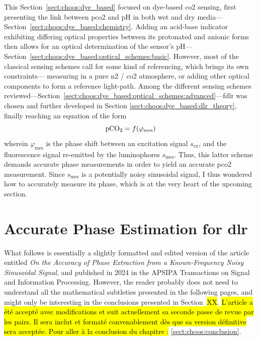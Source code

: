 This Section~\ref{sect:choos:dye_based} focused on dye-based \gls{co2} sensing, first presenting the link between \gls{pco2} and pH in both wet and dry media---Section~\ref{sect:choos:dye_based:chemistry}. Adding an acid-base indicator exhibiting differing optical properties between its protonated and anionic forms then allows for an optical determination of the sensor's pH---Section~\ref{sect:choos:dye_based:optical_schemes:basic}. However, most of the classical sensing schemes call for some kind of referencing, which brings its own constraints---\eg{} measuring in a pure \gls{n2} / \gls{co2} atmosphere, or adding other optical components to form a reference light-path. Among the different sensing schemes reviewed---Section~\ref{sect:choos:dye_based:optical_schemes:advanced}---\gls{fdlr} was chosen and further developed in Section \ref{sect:choos:dye_based:dlr_theory}, finally reaching an equation of the form
\begin{equation}
	\ce{pCO_2} = f(\varphi_\text{mes})
\end{equation}
wherein $\varphi_\text{mes}$ is the phase shift between an excitation signal $s_\text{ex}$, and the fluorescence signal re-emitted by the luminophores $s_\text{mes}$. Thus, this latter scheme demands accurate phase measurements in order to yield an accurate \gls{pco2} measurement. Since $s_\text{mes}$ is a potentially noisy sinusoidal signal, I thus wondered how to accurately measure its phase, which is at the very heart of the upcoming section.

\section{Accurate Phase Estimation for \texorpdfstring{\gls{dlr}}{DLR}}\label{sect:choos:phase_mes}

What follows is essentially a slightly formatted and edited version of the article entitled \textit{On the Accuracy of Phase Extraction from a Known-Frequency Noisy	Sinusoidal Signal}, and published in 2024 in the APSIPA Transactions on Signal and Information Processing\cite{dervieux2024phase}. However, the reader probably does not need to understand all the mathematical subtleties presented in the following pages, and might only be interesting in the conclusions presented in Section~\hl{XX}. \hl{L'article a été accepté avec modifications et suit actuellement sa seconde passe de revue par les pairs. Il sera inclut et formaté convenablement dès que sa version définitive sera acceptée. Pour aller à la conclusion du chapitre :} \ref{sect:choos:conclusion}.

